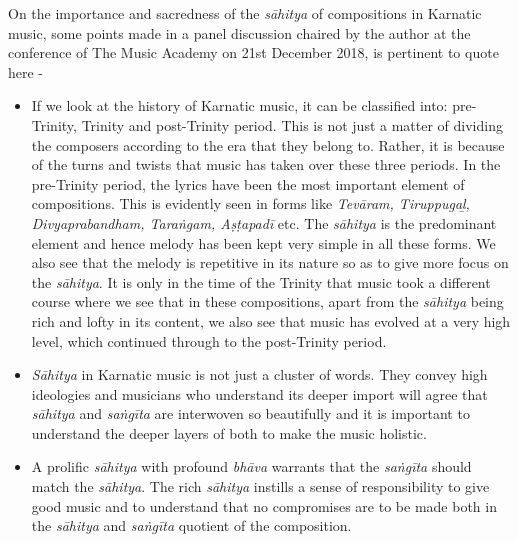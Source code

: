 On the importance and sacredness of the \textit{sāhitya} of compositions in Karnatic music, some points made in a panel discussion chaired by the author at the conference of The Music Academy on 21st December 2018, is pertinent to quote here -

\begin{itemize}
\itemsep=0pt

 \item If we look at the history of Karnatic music, it can be classified into: pre-Trinity, Trinity and post-Trinity period. This is not just a matter of dividing the composers according to the era that they belong to. Rather, it is because of the turns and twists that music has taken over these three periods. In the pre-Trinity period, the lyrics have been the most important element of compositions. This is evidently seen in forms like \textit{Tevāram, Tiruppugaḻ, Divyaprabandham, Taraṅgam, Aṣṭapadī} etc. The \textit{sāhitya} is the predominant element and hence melody has been kept very simple in all these forms. We also see that the melody is repetitive in its nature so as to give more focus on the \textit{sāhitya}. It is only in the time of the Trinity that music took a different course where we see that in these compositions, apart from the \textit{sāhitya} being rich and lofty in its content, we also see that music has evolved at a very high level, which continued through to the post-Trinity period.

 \item \textit{Sāhitya} in Karnatic music is not just a cluster of words. They convey high ideologies and musicians who understand its deeper import will agree that \textit{sāhitya} and \textit{saṅgīta} are interwoven so beautifully and it is important to understand the deeper layers of both to make the music holistic.

 \item A prolific \textit{sāhitya} with profound \textit{bhāva} warrants that the \textit{saṅgīta} should match the \textit{sāhitya}. The rich \textit{sāhitya} instills a sense of responsibility to give good music and to understand that no compromises are to be made both in the \textit{sāhitya} and \textit{saṅgīta} quotient of the composition.

\end{itemize}

